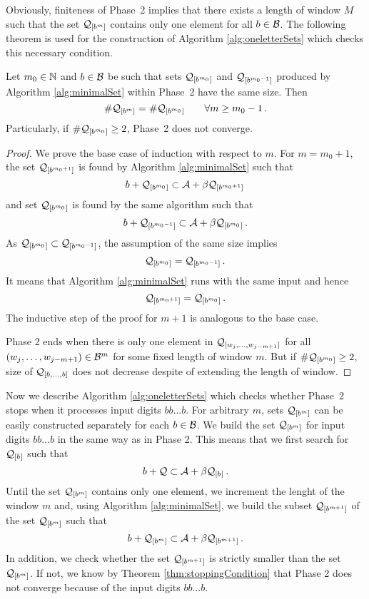 Obviously, finiteness of Phase~2 implies that there exists a length of window $M$ such that the set $\mathcal{Q}_{[b^{m}]}$ contains only one element for all $b\in\mathcal{B}$. 
The following theorem is used for the construction of Algorithm \ref{alg:oneletterSets} which checks this necessary condition. 

\begin{theo}
\label{thm:stoppingCondition}
Let $m_0 \in \mathbb{N}$ and $b\in\mathcal{B}$ be such that sets $\mathcal{Q}_{[b^{m_0}]}$ and $\mathcal{Q}_{[b^{m_0-1}]}$ produced by Algorithm \ref{alg:minimalSet} within Phase~2 have the same size. Then
$$
    \#\mathcal{Q}_{[b^{m}]} = \#\mathcal{Q}_{[b^{m_0}]} \qquad \forall m\geq m_0-1\,.
$$ 
Particularly, if $\#\mathcal{Q}_{[b^{m_0}]}\geq 2$, Phase~2 does not converge.
\end{theo}
\begin{proof}
We prove the base case of induction with respect to $m$. For $m=m_0+1$, the set $\mathcal{Q}_{[b^{m_0+1}]}$ is found by Algorithm \ref{alg:minimalSet} such that 
$$
b + \mathcal{Q}_{[b^{m_0}]} \subset \mathcal{A} + \beta \mathcal{Q}_{[b^{m_0+1}]}\,
$$
and set $\mathcal{Q}_{[b^{m_0}]}$ is found by the same algorithm such that
$$
b + \mathcal{Q}_{[b^{m_0-1}]} \subset \mathcal{A} + \beta \mathcal{Q}_{[b^{m_0}]}\,.
$$
As $\mathcal{Q}_{[b^{m_0}]} \subset \mathcal{Q}_{[b^{m_0-1}]}$, the assumption of the same size implies
$$
    \mathcal{Q}_{[b^{m_0}]} = \mathcal{Q}_{[b^{m_0-1}]}\,.
$$
It means that Algorithm \ref{alg:minimalSet} runs with the same input and hence
$$
\mathcal{Q}_{[b^{m_0+1}]}=\mathcal{Q}_{[b^{m_0}]}\,.
$$
The inductive step of the proof for $m+1$ is analogous to the base case.

Phase 2 ends when there is only one element in $\mathcal{Q}_{[w_j,\dots, w_{j-m+1}]}$ for all $(w_j,\dots, w_{j-m+1}) \in \mathcal{B}^m$ for some fixed length of window $m$. But if $\#\mathcal{Q}_{[b^{m_0}]}\geq 2$, size of $\mathcal{Q}_{[b,\dots,b]}$ does not decrease despite of extending the length of window.
\end{proof}

 Now we describe Algorithm \ref{alg:oneletterSets} which checks whether Phase~2 stops when it processes input digits $bb\dots b$.
For arbitrary $m$, sets $\mathcal{Q}_{[b^{m}]}$  can be easily constructed separately for each $b\in\mathcal{B}$. We build the set $\mathcal{Q}_{[b^{m}]}$ for input digits $bb\dots b$ in the same way as in Phase 2. This means that we first search for $\mathcal{Q}_{[b^{}]}$ such that 
$$
b + \mathcal{Q} \subset \mathcal{A} + \beta \mathcal{Q}_{[b^{}]}\,.
$$
Until the set $\mathcal{Q}_{[b^{m}]}$ contains only one element, we increment the lenght of the window $m$ and, using Algorithm \ref{alg:minimalSet}, we build the subset $\mathcal{Q}_{[b^{m+1}]}$ of the set $\mathcal{Q}_{[b^{m}]}$ such that
$$
b + \mathcal{Q}_{[b^{m}]} \subset \mathcal{A} + \beta \mathcal{Q}_{[b^{m+1}]}\,.
$$
In addition, we check whether the set $\mathcal{Q}_{[b^{m+1}]}$ is strictly smaller than the set $\mathcal{Q}_{[b^{m}]}$. If not, we know by Theorem \ref{thm:stoppingCondition} that Phase 2 does not converge because of the input digits $bb\dots b$.

